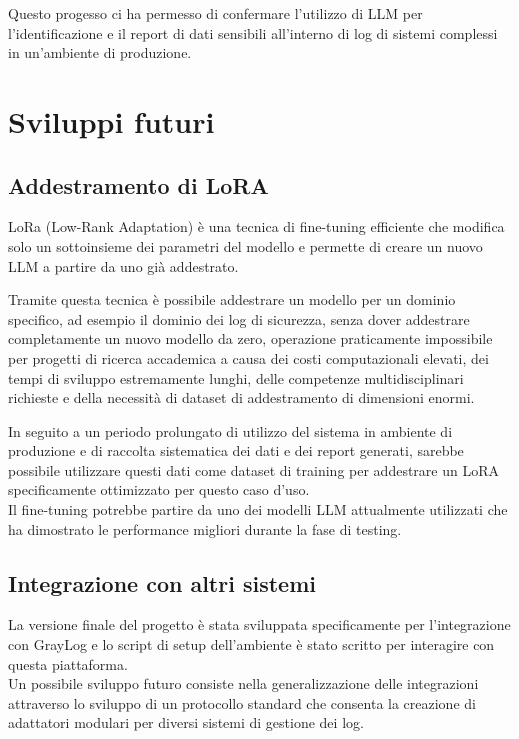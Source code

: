 \documentclass[12pt]{report}
\begin{document}
%
%



Questo progesso ci ha permesso di confermare l'utilizzo di LLM per l'identificazione e il report di dati sensibili all'interno di log di sistemi complessi in un'ambiente di produzione.

\section{Sviluppi futuri}
\label{sec:sviluppi_futuri}

\subsection{Addestramento di LoRA}
\label{subsec:addestramento_lora}

LoRa (Low-Rank Adaptation) è una tecnica di fine-tuning efficiente che modifica solo un sottoinsieme dei parametri del modello e permette di creare un nuovo LLM a partire da uno già addestrato.

Tramite questa tecnica è possibile addestrare un modello per un dominio specifico, ad esempio il dominio dei log di sicurezza, senza dover addestrare completamente un nuovo modello da zero, operazione praticamente impossibile per progetti di ricerca accademica a causa dei costi computazionali elevati, dei tempi di sviluppo estremamente lunghi, delle competenze multidisciplinari richieste e della necessità di dataset di addestramento di dimensioni enormi.

In seguito a un periodo prolungato di utilizzo del sistema in ambiente di produzione e di raccolta sistematica dei dati e dei report generati, sarebbe possibile utilizzare questi dati come dataset di training per addestrare un LoRA specificamente ottimizzato per questo caso d'uso. \\
Il fine-tuning potrebbe partire da uno dei modelli LLM attualmente utilizzati che ha dimostrato le performance migliori durante la fase di testing.

\subsection{Integrazione con altri sistemi}
\label{subsec:integrazione_sistemi}

La versione finale del progetto è stata sviluppata specificamente per l'integrazione con GrayLog e lo script di setup dell'ambiente è stato scritto per interagire con questa piattaforma. \\
Un possibile sviluppo futuro consiste nella generalizzazione delle integrazioni attraverso lo sviluppo di un protocollo standard che consenta la creazione di adattatori modulari per diversi sistemi di gestione dei log.
\end{document}
